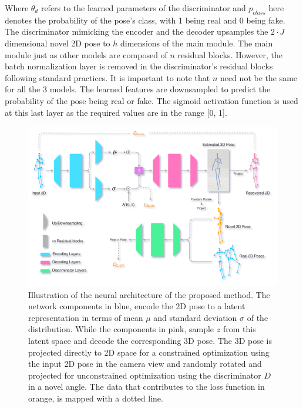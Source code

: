 Where $\theta_d$ refers to the learned parameters of the discriminator and $p_{class}$ here denotes the probability of the pose's class, with 1 being real and 0 being fake. The discriminator mimicking the encoder and the decoder upsamples the $2\!\cdot\!J$ dimensional novel 2D pose to $h$ dimensions of the main module. The main module just as other models are composed of $n$ residual blocks. However, the batch normalization layer is removed in the discriminator's residual blocks following standard practices. It is important to note that $n$ need not be the same for all the 3 models. The learned features are downsampled to predict the probability of the pose being real or fake. The sigmoid activation function is used at this last layer as the required values are in the range [0, 1].

\begin{figure}[h] 
    \centering
    \includegraphics[width=\textwidth]{figures/arch/method_arch.png}
    \caption{Illustration of the neural architecture of the proposed method. The network components in blue, encode the 2D pose to a latent representation in terms of mean $\mu$ and standard deviation $\sigma$ of the distribution. While the components in pink, sample $z$ from this latent space and decode the corresponding 3D pose. The 3D pose is projected directly to 2D space for a constrained optimization using the input 2D pose in the camera view and randomly rotated and projected for unconstrained optimization using the discriminator $D$ in a novel angle. The data that contributes to the loss function in orange, is mapped with a dotted line.
    }
    \label{fig:method_arch}
\end{figure}

